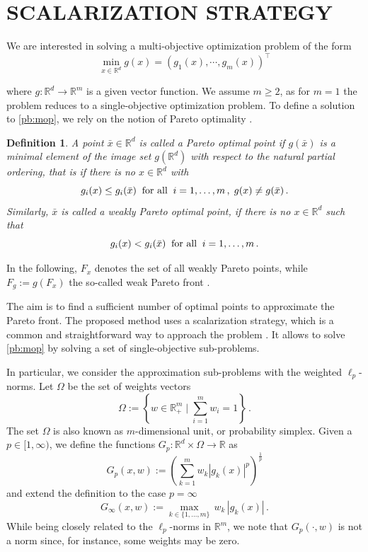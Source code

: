 \documentclass[letterpaper, 10 pt, conference]{ieeeconf}  %
\newtheorem{definition}{Definition}
\begin{document}
\section{SCALARIZATION STRATEGY}
\label{s:2}
We are interested in solving a multi-objective optimization problem of the form
\begin{equation}
\min_{x \in \mathbb{R}^d} g(x)  = \left (g_1(x), \cdots, g_m(x) \right)^\top
\label{pb:mop}
\end{equation}

where $g: \mathbb{R}^d \to \mathbb{R}^m$ is a given vector function. We assume $m \geq 2$, as for $m=1$ the problem reduces to a single-objective optimization problem. To define a solution to \eqref{pb:mop}, we rely on the notion of Pareto optimality \cite{jahn2004vector}.

\begin{definition}
A point $\bar x \in \mathbb{R}^d$ is called a \textit{Pareto optimal point} if $g(\bar x)$ is a minimal element of the image set $g(\mathbb{R}^d)$ with respect to the natural partial ordering, that is if there is no $x \in \mathbb{R}^d$ with
\[ g_i(x) \leq g_i(\bar x) \;\; \textup{for all}\;\; i=1, \dots, m\,, \; g(x) \neq g(\bar x)\,.\]
Similarly, $\bar x$ is called a \textit{weakly Pareto optimal point}, if there is no $x \in \mathbb{R}^d$ such that  
\[ g_i(x) < g_i(\bar x)\; \; \textup{for all}\;\; i=1, \dots, m\,.
\]
\end{definition}

In the following, $F_x$ denotes the set of all weakly Pareto points, while $F_g :=g(F_x)$ the so-called weak Pareto front \cite{book2005mop}.


The aim is to find a sufficient number of optimal points to approximate the Pareto front. The proposed method uses a scalarization strategy, which is a common and straightforward way to approach the problem \cite{jahn2004vector,book2005mop}. It allows to solve \eqref{pb:mop} by solving a set of single-objective sub-problems. 

In particular, we consider the approximation sub-problems \cite{jahn2004vector} with the weighted $\ell_p$-norms. Let $\Omega$ be the set of weights vectors
\begin{equation*} \Omega :=\left \{ w \in \mathbb{R}^m_{+}\; | \;\sum_{i=1}^m w_i = 1 \right\}\,.
\end{equation*}
The set $\Omega$ is also known as $m$-dimensional unit, or probability simplex.
Given a $p \in [1,\infty)$, we define the functions $G_p : \mathbb{R}^d \times \Omega \to \mathbb{R}$ as
\begin{equation}
G_p(x,w) := \left( \sum_{k=1}^m w_k |g_k(x)|^p \right)^{\frac1p}
\end{equation}
and extend the definition to the case $p=\infty$
\begin{equation}
G_\infty (x,w) := \max_{k\in \{ 1, \dots, m\}}\, w_k  \,|g_k(x)|\,.
\end{equation}
While being closely related to the $\ell_p$-norms in $\mathbb{R}^m$, we note that  $G_p(\cdot, w)$ is not a norm since, for instance, some weights may be zero. 
\end{document}
